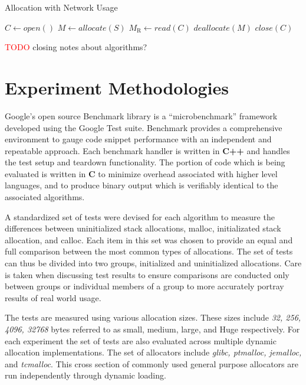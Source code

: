 \documentclass[letterpaper, 10 pt, conference]{ieeeconf}  %
\newcommand*\todo[0]{\textcolor{red}{TODO }}
\begin{document}
\begin{algorithm}[h]
  \caption{Allocation with Network Usage}
  \begin{algorithmic}
    \STATE $C \leftarrow open()$
      \STATE $M \leftarrow allocate(S)$
      \STATE $M_\text{R} \leftarrow read(C)$
      \STATE $deallocate(M)$
    \ENDWHILE
    \STATE $close(C)$
  \end{algorithmic}
  \label{network_usage_algorithm}
\end{algorithm}

\todo closing notes about algorithms?

\section{Experiment Methodologies}
Google's open source Benchmark library is a ``microbenchmark'' framework developed using the Google Test suite.
Benchmark provides a comprehensive environment to gauge code snippet performance with an independent and repeatable approach.
Each benchmark handler is written in \textbf{C++} and handles the test setup and teardown functionality.
The portion of code which is being evaluated is written in \textbf{C} to minimize overhead associated with higher level languages, and to produce binary output which is verifiably identical to the associated algorithms.

A standardized set of tests were devised for each algorithm to measure the differences between uninitialized stack allocations, malloc, initializated stack allocation, and calloc.
Each item in this set was chosen to provide an equal and full comparison between the most common types of allocations.
The set of tests can thus be divided into two groups, initialized and uninitialized allocations.
Care is taken when discussing test results to ensure comparisons are conducted only between groups or individual members of a group to more accurately portray results of real world usage. 

The tests are measured using various allocation sizes.
These sizes include \textit{32, 256, 4096, 32768} bytes referred to as small, medium, large, and Huge respectively.
For each experiment the set of tests are also evaluated across multiple dynamic allocation implementations.
The set of allocators include \textit{glibc, ptmalloc, jemalloc,} and \textit{tcmalloc}. %
This cross section of commonly used general purpose allocators are run independently through dynamic loading.
\end{document}
